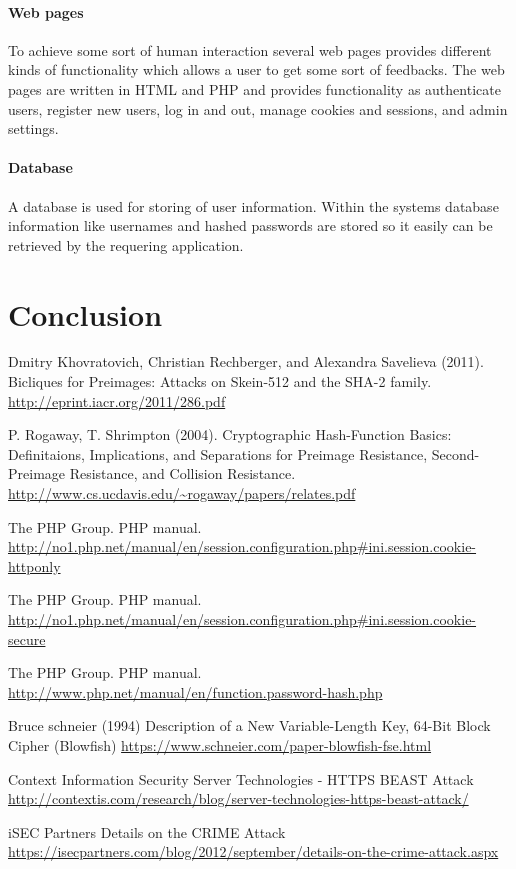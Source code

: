 \documentclass[11pt, a4paper]{article}
\begin{document}
\paragraph{Web pages}
To achieve some sort of human interaction several web pages provides different kinds of functionality which allows a user to get some sort of feedbacks. The web pages are written in HTML and PHP and provides functionality as authenticate users, register new users, log in and out, manage cookies and sessions, and admin settings.
\paragraph{Database}
A database is used for storing of user information. Within the systems database information like usernames and hashed passwords are stored so it easily can be retrieved by the requering application.
 
\section{Conclusion}

\begin{thebibliography}{9}

    Dmitry Khovratovich, Christian Rechberger, and Alexandra Savelieva (2011).
    Bicliques for Preimages: Attacks on Skein-512 and the SHA-2 family.
    \url{http://eprint.iacr.org/2011/286.pdf}

    P. Rogaway, T. Shrimpton (2004).
    Cryptographic Hash-Function Basics: Definitaions, Implications, and Separations for Preimage Resistance, Second-Preimage Resistance, and Collision Resistance.
    \url{http://www.cs.ucdavis.edu/~rogaway/papers/relates.pdf}

    The PHP Group.
    PHP manual.
    \url{http://no1.php.net/manual/en/session.configuration.php#ini.session.cookie-httponly}
    
    The PHP Group.
    PHP manual.
    \url{http://no1.php.net/manual/en/session.configuration.php#ini.session.cookie-secure}

    The PHP Group.
    PHP manual.
    \url{http://www.php.net/manual/en/function.password-hash.php}

    Bruce schneier (1994)
    Description of a New Variable-Length Key, 64-Bit Block Cipher (Blowfish)
    \url{https://www.schneier.com/paper-blowfish-fse.html}

    Context Information Security
    Server Technologies - HTTPS BEAST Attack
    \url{http://contextis.com/research/blog/server-technologies-https-beast-attack/}

    iSEC Partners
    Details on the CRIME Attack
    \url{https://isecpartners.com/blog/2012/september/details-on-the-crime-attack.aspx}

\end{thebibliography}
\end{document}
